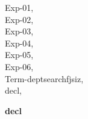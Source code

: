 \documentclass[a4paper]{article}
\begin{document}
\raggedright
              


{\parindent0cm

\begin{multicols}{3}
Exp-01, \pageref{lemma-Exp-01}\\
Exp-02, \pageref{lemma-Exp-02}\\
Exp-03, \pageref{lemma-Exp-03}\\
Exp-04, \pageref{lemma-Exp-04}\\
Exp-05, \pageref{lemma-Exp-05}\\
Exp-06, \pageref{lemma-Exp-06}\\
Term-deptsearchfjsiz, \pageref{lemma-Term-deptsearchfjsiz}\\
decl, \pageref{lemma-decl}\\

\end{multicols}}

{\LARGE\bf decl}\label{lemma-decl}

\medskip
\end{document}
